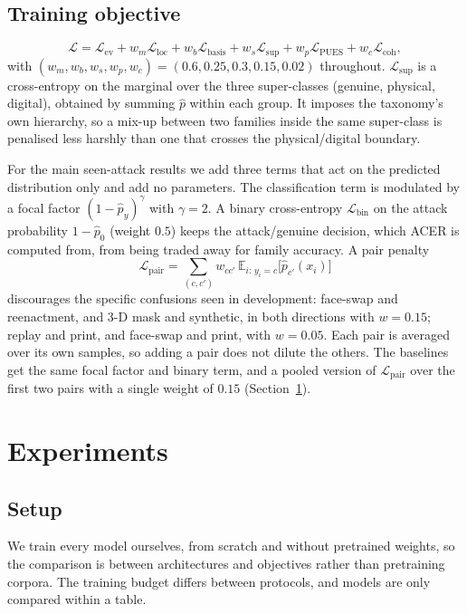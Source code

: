 \documentclass[conference]{IEEEtran}
\begin{document}
\subsection{Training objective}
\begin{equation}
\mathcal{L} = \mathcal{L}_{\text{ev}} + w_{m}\mathcal{L}_{\text{loc}}
+ w_{b}\mathcal{L}_{\text{basis}} + w_{s}\mathcal{L}_{\text{sup}}
+ w_{p}\mathcal{L}_{\text{PUES}} + w_{c}\mathcal{L}_{\text{coh}},
\end{equation}
with $(w_{m},w_{b},w_{s},w_{p},w_{c})=(0.6,0.25,0.3,0.15,0.02)$ throughout.
$\mathcal{L}_{\text{sup}}$ is a cross-entropy on the marginal over the three
super-classes (genuine, physical, digital), obtained by summing $\hat{p}$ within each
group. It imposes the taxonomy's own hierarchy, so a mix-up between two families
inside the same super-class is penalised less harshly than one that crosses the
physical/digital boundary.

For the main seen-attack results we add three terms that act on the predicted
distribution only and add no parameters. The classification term is modulated by
a focal factor $(1-\hat{p}_{y})^{\gamma}$ with $\gamma=2$. A binary cross-entropy
$\mathcal{L}_{\text{bin}}$ on the attack probability $1-\hat{p}_{0}$ (weight $0.5$)
keeps the attack/genuine decision, which ACER is computed from, from being
traded away for family accuracy. A pair penalty
\begin{equation}
\mathcal{L}_{\text{pair}} = \sum_{(c,c')} w_{cc'}\,
\mathbb{E}_{i:\,y_i=c}\bigl[\hat{p}_{c'}(x_i)\bigr]
\end{equation}
discourages the specific confusions seen in development: face-swap and
reenactment, and 3-D mask and synthetic, in both directions with $w=0.15$; replay
and print, and face-swap and print, with $w=0.05$. Each pair is averaged over its
own samples, so adding a pair does not dilute the others. The baselines get the
same focal factor and binary term, and a pooled version of
$\mathcal{L}_{\text{pair}}$ over the first two pairs with a single weight of $0.15$
(Section~\ref{sec:exp}).

\section{Experiments}\label{sec:exp}

\subsection{Setup}
We train every model ourselves, from scratch and without pretrained weights, so
the comparison is between architectures and objectives rather than pretraining
corpora. The training budget differs between protocols, and models are only
compared within a table.
\end{document}
